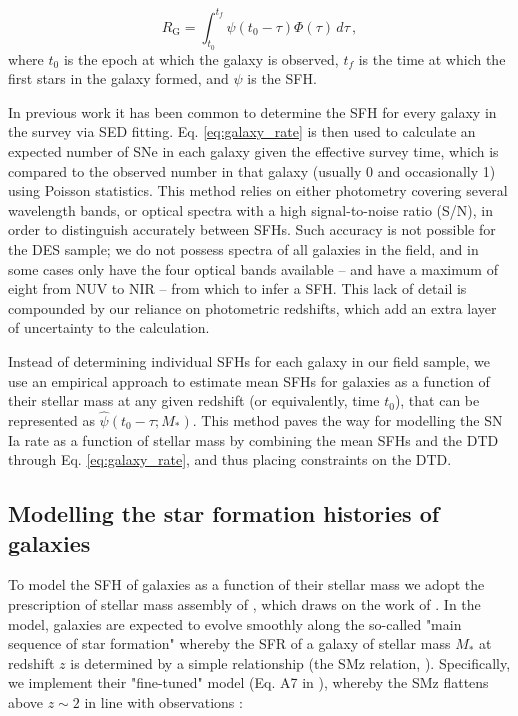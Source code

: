 \documentclass[fleqn,usenatbib]{mnras}
\begin{document}
\begin{equation}
    R_{\mathrm{G}} = \int_{t_0}^{t_f} \psi(t_0-\tau)\Phi(\tau)\,d\tau \,,
    \label{eq:galaxy_rate}
\end{equation}
where $t_0$ is the epoch at which the galaxy is observed, $t_f$ is the time at which the first stars in the galaxy formed, and $\psi$ is the SFH. 

In previous work \citep[e.g.][]{Strolger2004,Maoz2012} it has been common to determine the SFH for every galaxy in the survey via SED fitting. Eq. \ref{eq:galaxy_rate} is then used to calculate an expected number of SNe in each galaxy given the effective survey time, which is compared to the observed number in that galaxy (usually 0 and occasionally 1) using Poisson statistics. This method relies on either photometry covering several wavelength bands, or optical spectra with a high signal-to-noise ratio (S/N), in order to distinguish accurately between SFHs. Such accuracy is not possible for the DES sample; we do not possess spectra of all galaxies in the field, and in some cases only have the four optical bands available -- and have a maximum of eight from NUV to NIR -- from which to infer a SFH. This lack of detail is compounded by our reliance on photometric redshifts, which add an extra layer of uncertainty to the calculation. 

Instead of determining individual SFHs for each galaxy in our field sample, we use an empirical approach to estimate mean SFHs for galaxies as a function of their stellar mass at any given redshift (or equivalently, time $t_0$), that can be represented as $\hat \psi \left(t_0 -\tau; M_* \right)$. This method paves the way for modelling the SN Ia rate as a function of stellar mass by combining the mean SFHs and the DTD through Eq. \ref{eq:galaxy_rate}, and thus placing constraints on the DTD.

\subsection{Modelling the star formation histories of galaxies \label{subsec:method_sfh}}

To model the SFH of galaxies as a function of their stellar mass we adopt the prescription of stellar mass assembly of , which draws on the work of \citet{Zahid2012}. In the model, galaxies are expected to evolve smoothly along the so-called "main sequence of star formation" whereby the SFR of a galaxy of stellar mass $M_*$ at redshift $z$ is determined by a simple relationship (the SMz relation, \citealt{Zahid2012}). Specifically, we implement their "fine-tuned" model (Eq. A7 in ), whereby the SMz flattens above $z\sim2$ in line with observations \citep{Stark2013}:
\end{document}
